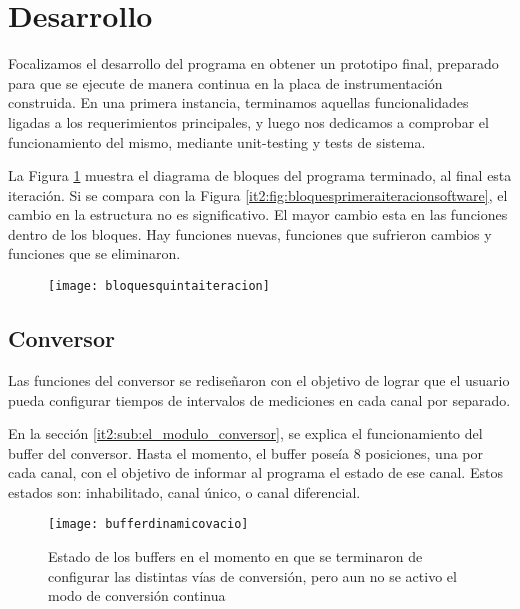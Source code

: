 
\section{Desarrollo} %
\label{it5:sec:desarrollo}

Focalizamos el desarrollo del programa en obtener un prototipo final, preparado para que se ejecute de manera continua en la placa de instrumentación construida. En una primera instancia, terminamos aquellas funcionalidades ligadas a los requerimientos principales, y luego nos dedicamos a comprobar el funcionamiento del mismo, mediante unit-testing y tests de sistema.

La Figura \ref{it5:fig:bloquesquintaiteracion} muestra el diagrama de bloques del programa terminado, al final esta iteración. Si se compara con la Figura \ref{it2:fig:bloquesprimeraiteracionsoftware}, el cambio en la estructura no es significativo. El mayor cambio esta en las funciones dentro de los bloques. Hay funciones nuevas, funciones que sufrieron cambios y funciones que se eliminaron.

\begin{figure}[h]
  \centering
  \texttt{[image: bloquesquintaiteracion]}
  \caption{}\label{it5:fig:bloquesquintaiteracion}
\end{figure}

\subsection{Conversor} %
\label{sub:conversor}

Las funciones del conversor se rediseñaron con el objetivo de lograr que el usuario pueda configurar tiempos de intervalos de mediciones en cada canal por separado.

En la sección \ref{it2:sub:el_modulo_conversor}, se explica el funcionamiento del buffer del conversor. Hasta el momento, el buffer poseía 8 posiciones, una por cada canal, con el objetivo de informar al programa el estado de ese canal. Estos estados son: inhabilitado, canal único, o canal diferencial.

\begin{figure}[h]
  \centering
  \texttt{[image: bufferdinamicovacio]}
  \caption{Estado de los buffers en el momento en que se terminaron de configurar las distintas vías de conversión, pero aun no se activo el modo de conversión continua}\label{it5:fig:bufferdinamicovacio}
\end{figure}

